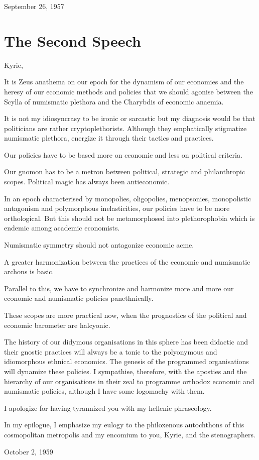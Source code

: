 \begin{flushright}
    September 26, 1957
\end{flushright}

\section{The Second Speech}

Kyrie,

It is Zeus\textquotesingle{} anathema on our epoch for the
dynamism of our economies and the heresy of our economic methods
and policies that we should agonise between the Scylla of
numismatic plethora and the Charybdis of economic anaemia.

It is not my idiosyncrasy to be ironic or sarcastic but my
diagnosis would be that politicians are rather cryptoplethorists.
Although they emphatically stigmatize numismatic plethora,
energize it through their tactics and practices.

Our policies have to be based more on economic and less on
political criteria.

Our gnomon has to be a metron between political, strategic and
philanthropic scopes. Political magic has always been
antieconomic.

In an epoch characterised by monopolies, oligopolies, menopsonies,
monopolistic antagonism and polymorphous inelasticities, our
policies have to be more orthological. But this should not be
metamorphosed into plethorophobia which is endemic among academic
economists.

Numismatic symmetry should not antagonize economic acme.

A greater harmonization between the practices of the economic and
numismatic archons is basic.

Parallel to this, we have to synchronize and harmonize more and
more our economic and numismatic policies panethnically.

These scopes are more practical now, when the prognostics of the
political and economic barometer are halcyonic.

The history of our didymous organisations in this sphere has been
didactic and their gnostic practices will always be a tonic to the
polyonymous and idiomorphous ethnical economics. The genesis of
the programmed organisations will dynamize these policies. I
sympathise, therefore, with the aposties and the hierarchy of our
organisations in their zeal to programme orthodox economic and
numismatic policies, although I have some logomachy with them.

I apologize for having tyrannized you with my hellenic
phraseology.

In my epilogue, I emphasize my eulogy to the philoxenous
autochthons of this cosmopolitan metropolis and my encomium to
you, Kyrie, and the stenographers.

\begin{flushright}
    October 2, 1959
\end{flushright}
